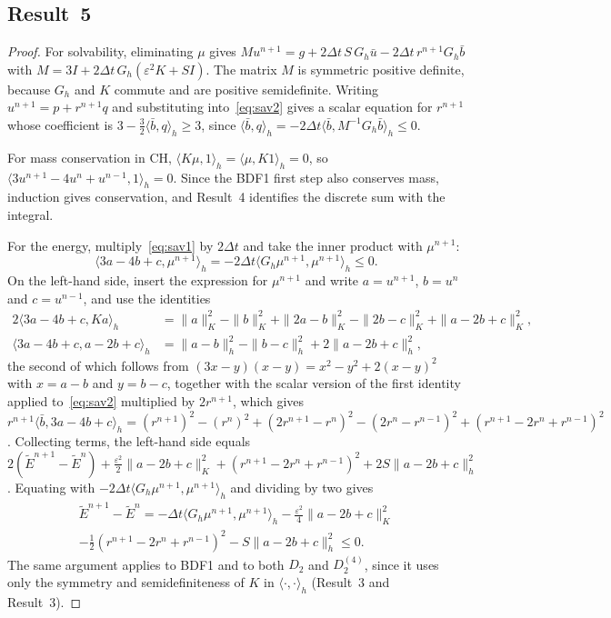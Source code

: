 \documentclass[11pt]{article}
\begin{document}
\subsection*{Result~5}

\begin{proof}
For solvability, eliminating $\mu$ gives $Mu^{n+1}=g+2\Delta t\,S\,G_h\bar u-2\Delta t\,r^{n+1}G_h\bar b$
with $M=3I+2\Delta t\,G_h(\varepsilon^2K+SI)$. The matrix $M$ is symmetric positive definite, because $G_h$
and $K$ commute and are positive semidefinite. Writing $u^{n+1}=p+r^{n+1}q$ and substituting
into~\eqref{eq:sav2} gives a scalar equation for $r^{n+1}$ whose coefficient is
$3-\tfrac32\langle\bar b,q\rangle_h\ge3$, since
$\langle\bar b,q\rangle_h=-2\Delta t\langle\bar b,M^{-1}G_h\bar b\rangle_h\le0$.

For mass conservation in CH, $\langle K\mu,1\rangle_h=\langle\mu,K1\rangle_h=0$, so
$\langle3u^{n+1}-4u^n+u^{n-1},1\rangle_h=0$. Since the BDF1 first step also conserves mass, induction gives
conservation, and Result~4 identifies the discrete sum with the integral.

For the energy, multiply~\eqref{eq:sav1} by $2\Delta t$ and take the inner product with $\mu^{n+1}$:
\[
\langle3a-4b+c,\mu^{n+1}\rangle_h=-2\Delta t\langle G_h\mu^{n+1},\mu^{n+1}\rangle_h\le0 .
\]
On the left-hand side, insert the expression for $\mu^{n+1}$ and write $a=u^{n+1}$, $b=u^n$ and
$c=u^{n-1}$, and use the identities
\begin{align*}
2\langle3a-4b+c,Ka\rangle_h&=\|a\|_K^2-\|b\|_K^2+\|2a-b\|_K^2-\|2b-c\|_K^2+\|a-2b+c\|_K^2,\\
\langle3a-4b+c,a-2b+c\rangle_h&=\|a-b\|_h^2-\|b-c\|_h^2+2\|a-2b+c\|_h^2,
\end{align*}
the second of which follows from $(3x-y)(x-y)=x^2-y^2+2(x-y)^2$ with $x=a-b$ and $y=b-c$, together with
the scalar version of the first identity applied to~\eqref{eq:sav2} multiplied by $2r^{n+1}$, which gives
$r^{n+1}\langle\bar b,3a-4b+c\rangle_h=(r^{n+1})^2-(r^n)^2+(2r^{n+1}-r^n)^2-(2r^n-r^{n-1})^2+(r^{n+1}-2r^n+r^{n-1})^2$.
Collecting terms, the left-hand side equals
$2(\tilde E^{n+1}-\tilde E^n)+\tfrac{\varepsilon^2}{2}\|a-2b+c\|_K^2+(r^{n+1}-2r^n+r^{n-1})^2+2S\|a-2b+c\|_h^2$.
Equating with $-2\Delta t\langle G_h\mu^{n+1},\mu^{n+1}\rangle_h$ and dividing by two gives
\begin{multline*}
\tilde E^{n+1}-\tilde E^n=-\Delta t\langle G_h\mu^{n+1},\mu^{n+1}\rangle_h-\tfrac{\varepsilon^2}{4}\|a-2b+c\|_K^2\\
-\tfrac12(r^{n+1}-2r^n+r^{n-1})^2-S\|a-2b+c\|_h^2\le0.
\end{multline*}
The same argument applies to BDF1 and to both $D_2$ and $D_2^{(4)}$, since it uses only the symmetry and
semidefiniteness of $K$ in $\langle\cdot,\cdot\rangle_h$ (Result~3 and
Result~3).
\end{proof}
\end{document}

